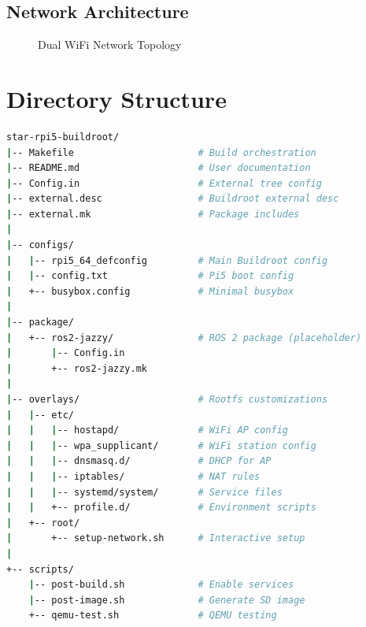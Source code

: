 \subsection{Network Architecture}

\begin{figure}[H]
\centering
{}
\caption{Dual WiFi Network Topology}
\end{figure}

\section{Directory Structure}

\begin{lstlisting}[language=bash]
star-rpi5-buildroot/
|-- Makefile                      # Build orchestration
|-- README.md                     # User documentation
|-- Config.in                     # External tree config
|-- external.desc                 # Buildroot external desc
|-- external.mk                   # Package includes
|
|-- configs/
|   |-- rpi5_64_defconfig         # Main Buildroot config
|   |-- config.txt                # Pi5 boot config
|   +-- busybox.config            # Minimal busybox
|
|-- package/
|   +-- ros2-jazzy/               # ROS 2 package (placeholder)
|       |-- Config.in
|       +-- ros2-jazzy.mk
|
|-- overlays/                     # Rootfs customizations
|   |-- etc/
|   |   |-- hostapd/              # WiFi AP config
|   |   |-- wpa_supplicant/       # WiFi station config
|   |   |-- dnsmasq.d/            # DHCP for AP
|   |   |-- iptables/             # NAT rules
|   |   |-- systemd/system/       # Service files
|   |   +-- profile.d/            # Environment scripts
|   +-- root/
|       +-- setup-network.sh      # Interactive setup
|
+-- scripts/
    |-- post-build.sh             # Enable services
    |-- post-image.sh             # Generate SD image
    +-- qemu-test.sh              # QEMU testing
\end{lstlisting}

